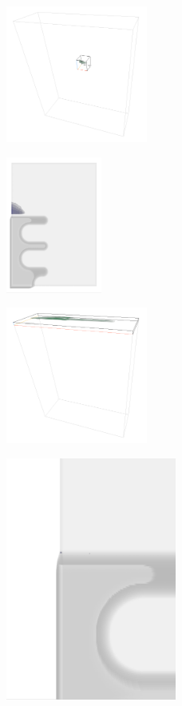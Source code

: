 \documentclass[a4paper,fontsize=12pt,toc=bib,halfparskip]{scrartcl}
\begin{document}
\begin{figure}
	\begin{subfigure}{0.49\textwidth}
		\centering
		\includegraphics[height=4.5cm]{pictures/results/Nodel/Nodel_InvariantSpace1.png}
		\subcaption{}
		\label{}
	\end{subfigure}
	\hspace*{\fill}
	\begin{subfigure}{0.49\textwidth}
		\centering
		\includegraphics[height=4.5cm]{pictures/results/Nodel/Nodel_Object1.png}
		\subcaption{}
		\label{}
	\end{subfigure}
	\medskip
	\begin{subfigure}{0.49\textwidth}
		\centering
		\includegraphics[height=4.5cm]{pictures/results/Nodel/Nodel_InvariantSpace2.png}
		\subcaption{}
		\label{}
	\end{subfigure}
	\hspace*{\fill}
	\begin{subfigure}{0.49\textwidth}
		\centering
		\includegraphics[height=8cm]{pictures/results/Nodel/Nodel_Object2.png}

\end{subfigure}
\end{figure}
\end{document}
